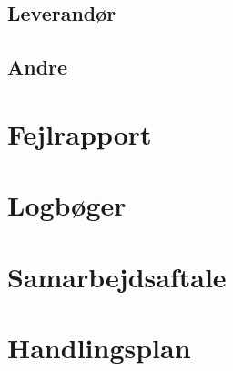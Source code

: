 \subsection{Leverandør}
\label{mailleverandor}

\subsection{Andre}
\label{mailAndre}

\section{Fejlrapport}
\label{Fejlrapport}

\section{Logbøger}
\label{bilag:Logboger}

\section{Samarbejdsaftale}
\label{bilag:samarbejdsaftale}

\section{Handlingsplan}
\label{bilag:Handlingsplan}